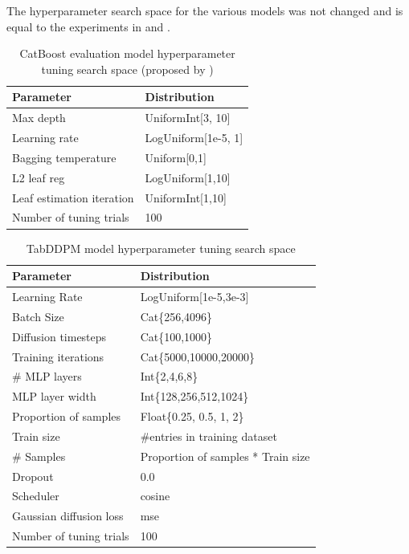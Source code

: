 The hyperparameter search space for the various models was not changed and is equal to the experiments in \cite{kotelnikov2022TabDDPMModellingTabular} and .
\begin{table}[h]
	\centering
	\begin{tabular}{l | l }
		\hline
		Parameter                 & Distribution        \\
		\hline
		Max depth                 & UniformInt[3, 10]   \\
		Learning rate             & LogUniform[1e-5, 1] \\
		Bagging temperature       & Uniform[0,1]        \\
		L2 leaf reg               & LogUniform[1,10]    \\
		Leaf estimation iteration & UniformInt[1,10]    \\
		\hline
		Number of tuning trials   & 100
	\end{tabular}
	\caption{CatBoost evaluation model hyperparameter tuning search space (proposed by \cite{gorishniy2021RevisitingDeepLearning})}
	\label{tab:catboost_tune}
\end{table}

\begin{table}[h]
	\centering
	\begin{tabular}{l | l }
		\toprule
		Parameter               & Distribution                       \\
		\midrule
		Learning Rate           & LogUniform[1e-5,3e-3]              \\
		Batch Size              & Cat\{256,4096\}                    \\
		Diffusion timesteps     & Cat\{100,1000\}                    \\
		Training iterations     & Cat\{5000,10000,20000\}            \\
		\# MLP layers           & Int\{2,4,6,8\}                     \\
		MLP layer width         & Int\{128,256,512,1024\}            \\
		Proportion of samples   & Float\{0.25, 0.5, 1, 2\}           \\
		\midrule
		Train size              & \#entries in training dataset      \\
		\# Samples              & Proportion of samples * Train size \\
		Dropout                 & 0.0                                \\
		Scheduler               & cosine                             \\
		Gaussian diffusion loss & mse                                \\
		\bottomrule
		Number of tuning trials & 100
	\end{tabular}
	\caption{TabDDPM model hyperparameter tuning search space}
	\label{tab:diff_tune}
\end{table}



